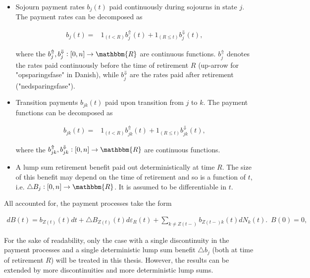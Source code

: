 \documentclass{book}
\newcommand{\1}[1]{\mathbbm{1}_{\left\lbrace #1 \right\rbrace}}
\theoremstyle{break}
\theoremstyle{remark}
\newenvironment{remark}
  {\pushQED{\qed}\renewcommand{\qedsymbol}{\scalebox{1.4}{$\circ$}}\remarkx}
  {\popQED\endremarkx}
\numberwithin{equation}{section}
\begin{document}
\begin{itemize}
    \item Sojourn payment rates $b_j(t)$ paid continuously during sojourns in state $j$. The payment rates can be decomposed as
    
    \begin{align*}
        b_j(t) =& 1_{\left( t<R \right)} b_j^{\Uparrow}(t) + 1_{\left( R \leq t \right)} b_j^{\Downarrow}(t),
    \end{align*}
    
    where the $b_j^{\Uparrow}, b_j^{\Downarrow}: [0,n] \to \mathbbm{R}$ are continuous functions. $b_j^{\Uparrow}$ denotes the rates paid continuously before the time of retirement $R$ (up-arrow for "opsparingsfase" in Danish), while $b_j^{\Downarrow}$ are the rates paid after retirement ("nedsparingsfase").
    
    
    
    \item Transition payments $b_{jk}(t)$ paid upon transition from $j$ to $k$. The payment functions can be decomposed as
    
    \begin{align*}
        b_{jk}(t) =& 1_{\left( t<R \right)} b_{jk}^{\Uparrow}(t) + 1_{\left( R \leq t \right)} b_{jk}^{\Downarrow}(t),
    \end{align*}
    
    where the $b_{jk}^{\Uparrow}, b_{jk}^{\Downarrow}: [0,n] \to \mathbbm{R}$ are continuous functions.
    
    
    
    \item A lump sum retirement benefit paid out deterministically at time $R$. The size of this benefit may depend on the time of retirement and so is a function of $t$, i.e. $\triangle B_j: [0,n] \to \mathbbm{R}$. It is assumed to be differentiable in $t$.
\end{itemize}

All accounted for, the payment processes take the form

\begin{align}
    dB(t) = b_{Z(t)}(t)dt + \triangle B_{Z(t)}(t) d \varepsilon_{R}(t) + \sum_{k \neq Z(t-)}b_{{Z(t-)}k}(t)dN_{k}(t). \, \, \, B(0) = 0, \label{PaymentProcessDef}
\end{align}

\begin{remark}
	For the sake of readability, only the case with a single discontinuity in the payment processes and a single deterministic lump sum benefit $\triangle b_j$ (both at time of retirement $R$) will be treated in this thesis. However, the results can be extended by more discontinuities and more deterministic lump sums.
\end{remark}
\end{document}

